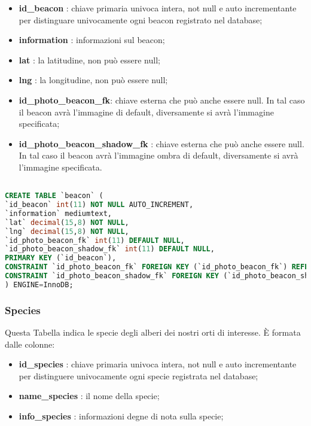 \begin{itemize}
\item \textbf{id\_beacon} : chiave primaria univoca intera, not null e auto incrementante per distinguare univocamente ogni beacon registrato nel database;
\item \textbf{information} : informazioni sul beacon;
\item \textbf{lat} : la latitudine, non può essere null;
\item \textbf{lng} : la longitudine, non può essere null;
\item \textbf{id\_photo\_beacon\_fk}: chiave esterna che può anche essere null. In tal caso il beacon avrà l'immagine di default, diversamente si avrà l'immagine specificata;
\item \textbf{id\_photo\_beacon\_shadow\_fk} : chiave esterna che può anche essere null. In tal caso il beacon avrà l'immagine ombra di default, diversamente si avrà l'immagine specificata.
\end{itemize}

\begin{lstlisting}[language=SQL, caption=Codice SQL della Tabella Beacon]

CREATE TABLE `beacon` (
`id_beacon` int(11) NOT NULL AUTO_INCREMENT,
`information` mediumtext,
`lat` decimal(15,8) NOT NULL,
`lng` decimal(15,8) NOT NULL,
`id_photo_beacon_fk` int(11) DEFAULT NULL,
`id_photo_beacon_shadow_fk` int(11) DEFAULT NULL,
PRIMARY KEY (`id_beacon`),
CONSTRAINT `id_photo_beacon_fk` FOREIGN KEY (`id_photo_beacon_fk`) REFERENCES `photo` (`id_photo`) ON UPDATE CASCADE,
CONSTRAINT `id_photo_beacon_shadow_fk` FOREIGN KEY (`id_photo_beacon_shadow_fk`) REFERENCES `photo` (`id_photo`) ON UPDATE CASCADE
) ENGINE=InnoDB;

\end{lstlisting}

\subsubsection{Species}
Questa Tabella indica le specie degli alberi dei nostri orti di interesse. \newline È formata dalle colonne:
\begin{itemize}
\item \textbf{id\_species} : chiave primaria univoca intera, not null e auto incrementante per distinguere univocamente ogni specie registrata nel database;

\item \textbf{name\_species} : il nome della specie;

\item \textbf{info\_species} : informazioni degne di nota sulla specie;
\end{itemize}

